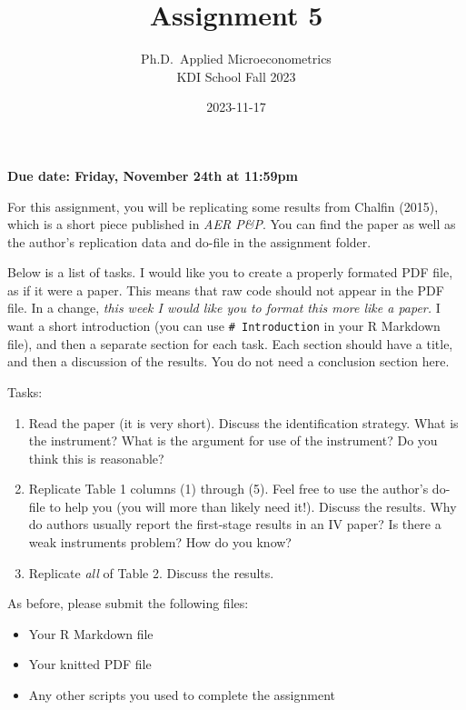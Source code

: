\documentclass[
]{article}
\title{Assignment 5}
\subtitle{Ph.D.~Applied Microeconometrics\\
KDI School Fall 2023}
\author{}
\date{\vspace{-2.5em}2023-11-17}
\providecommand{\tightlist}{%
  \setlength{\itemsep}{0pt}\setlength{\parskip}{0pt}}
\begin{document}
\maketitle

\textbf{Due date: Friday, November 24th at 11:59pm}

For this assignment, you will be replicating some results from Chalfin (2015), which is a short piece published in \emph{AER P\&P}. You can find the paper as well as the author's replication data and do-file in the assignment folder.

Below is a list of tasks. I would like you to create a properly formated PDF file, as if it were a paper. This means that raw code should not appear in the PDF file. In a change, \emph{this week I would like you to format this more like a paper.} I want a short introduction (you can use \texttt{\#\ Introduction} in your R Markdown file), and then a separate section for each task. Each section should have a title, and then a discussion of the results. You do not need a conclusion section here.

Tasks:

\begin{enumerate}
\def\labelenumi{\arabic{enumi}.}
\tightlist
\item
  Read the paper (it is very short). Discuss the identification strategy. What is the instrument? What is the argument for use of the instrument? Do you think this is reasonable?
\item
  Replicate Table 1 columns (1) through (5). Feel free to use the author's do-file to help you (you will more than likely need it!). Discuss the results. Why do authors usually report the first-stage results in an IV paper? Is there a weak instruments problem? How do you know?
\item
  Replicate \emph{all} of Table 2. Discuss the results.
\end{enumerate}

As before, please submit the following files:

\begin{itemize}
\tightlist
\item
  Your R Markdown file
\item
  Your knitted PDF file
\item
  Any other scripts you used to complete the assignment
\end{itemize}
\end{document}
